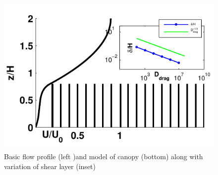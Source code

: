 \documentclass[aps,twocolumn,floatfix,prl,10pt]{revtex4-1}
\begin{document}
\begin{figure}[htb]
  \includegraphics[scale=0.8]{fig1}
\caption{Basic flow profile (left )and model of canopy (bottom) along with variation of shear layer (inset) }
\end{figure}
\end{document}

